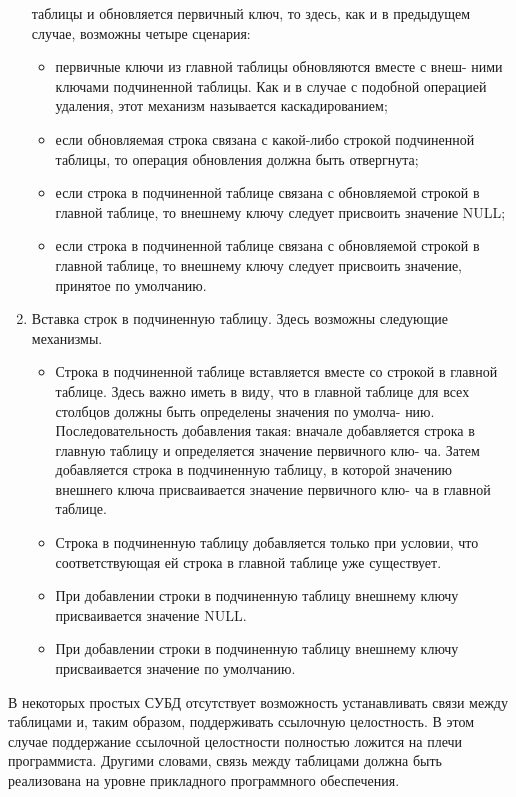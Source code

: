 \begin{enumerate}
таблицы и обновляется первичный ключ, то здесь, как и в предыдущем
случае, возможны четыре сценария:
\begin{itemize}
\item первичные ключи из главной таблицы обновляются вместе с внеш-
ними ключами подчиненной таблицы. Как и в случае с подобной
операцией удаления, этот механизм называется каскадированием;
\item если обновляемая строка связана с какой-либо строкой подчиненной
таблицы, то операция обновления должна быть отвергнута;
\item если строка в подчиненной таблице связана с обновляемой строкой в
главной таблице, то внешнему ключу следует присвоить значение
NULL;
\item если строка в подчиненной таблице связана с обновляемой строкой в
главной таблице, то внешнему ключу следует присвоить значение,
принятое по умолчанию.
\end{itemize}
\item Вставка строк в подчиненную таблицу. Здесь возможны следующие
механизмы.
\begin{itemize}
    \item Строка в подчиненной таблице вставляется вместе со строкой в
главной таблице. Здесь важно иметь в виду, что в главной таблице
для всех столбцов должны быть определены значения по умолча-
нию. Последовательность добавления такая: вначале добавляется
строка в главную таблицу и определяется значение первичного клю-
ча. Затем добавляется строка в подчиненную таблицу, в которой
значению внешнего ключа присваивается значение первичного клю-
ча в главной таблице.
\item Строка в подчиненную таблицу добавляется только при условии,
что соответствующая ей строка в главной таблице уже существует.
\item При добавлении строки в подчиненную таблицу внешнему ключу
присваивается значение NULL.
\item При добавлении строки в подчиненную таблицу внешнему ключу
присваивается значение по умолчанию.
\end{itemize}
\end{enumerate}
В некоторых простых СУБД отсутствует возможность устанавливать
связи между таблицами и, таким образом, поддерживать ссылочную целостность. В этом случае поддержание ссылочной целостности полностью ложится на плечи программиста. Другими словами, связь между таблицами должна быть реализована на уровне прикладного программного обеспечения.
